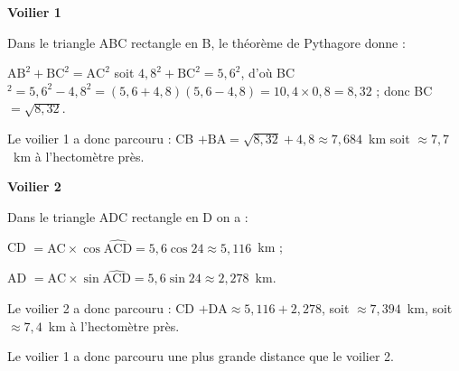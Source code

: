 
\medskip

%
%
%
\textbf{Voilier 1}

Dans le triangle ABC rectangle en B, le théorème de Pythagore donne :

$\text{AB}^2 + \text{BC}^2 = \text{AC}^2$ soit $4,8^2 +  \text{BC}^2 = 5,6^2$, d’où BC$^2 = 5,6^2 - 4,8^2 = (5,6 + 4,8)(5,6 - 4,8) = 10,4 \times 0,8 = 8,32$ ; donc BC $ = \sqrt{8,32}$.

Le voilier 1 a donc parcouru : CB $+ \text{BA} = \sqrt{8,32} + 4,8 \approx 7,684$~km soit $\approx 7,7$~km à l'hectomètre près.

\textbf{Voilier 2}

Dans le triangle ADC rectangle en D on a :

CD $= \text{AC} \times \cos \widehat{\text{ACD}} = 5,6\cos 24 \approx 5,116$~km ;

AD $ =  \text{AC} \times \sin \widehat{\text{ACD}} = 5,6\sin 24\approx 2,278$~km.

Le voilier 2 a donc parcouru : CD $+ \text{DA} \approx 5,116  + 2,278$, soit  $\approx 7,394$~km, soit $\approx 7,4$~km  à l'hectomètre près. 

Le voilier 1   a donc parcouru une plus grande distance que le voilier 2.
\vspace{0.5cm}

